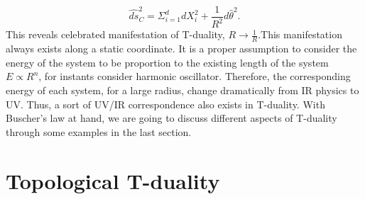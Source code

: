 \documentclass[a4paper]{article}
\begin{document}
\begin{equation}
\hat{ds}^2_{C}= \Sigma_{i=1}^{d} dX^2_{i} + \frac{1}{R^2} d \hat{\theta}^2.
\end{equation}
This reveals celebrated manifestation of T-duality, $R \to \frac{1}{R}$.This manifestation always exists along a static coordinate. It is a proper assumption to consider the energy of the system to be proportion to the existing length of the system $E \propto R^n$, for instants consider harmonic oscillator. Therefore, the corresponding energy of each system, for a large radius, change dramatically from IR physics to UV. Thus, a sort of UV/IR correspondence also exists in T-duality. With Buscher's law at hand, we are going to discuss different aspects of T-duality through some examples in the last section.
\section{Topological T-duality}
\end{document}
